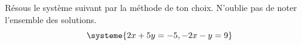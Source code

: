 %
%
    Résous le système suivant par la méthode de ton choix. N'oublie pas de noter l'ensemble des solutions.
    \[\systeme{2x+5y=-5, -2x-y=9}\] %
